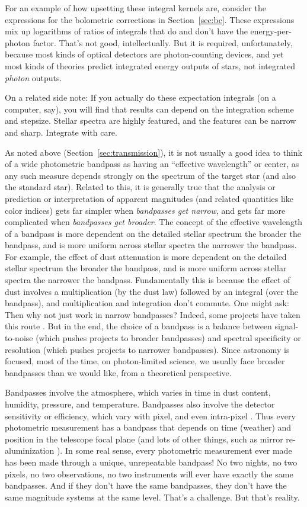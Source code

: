 \documentclass[10pt]{article}
\newcommand{\sectionname}{Section}
\newcommand{\secref}[1]{\sectionname~\ref{#1}}
\begin{document}
For an example of how upsetting these integral kernels are, consider the expressions for the bolometric corrections in \secref{sec:bc}.
These expressions mix up logarithms of ratios of integrals that do and don't have the energy-per-photon factor.
That's not good, intellectually.
But it is required, unfortunately, because most kinds of optical detectors are photon-counting devices, and yet most kinds of theories predict integrated energy outputs of stars, not integrated \emph{photon} outputs.

On a related side note:
If you actually do these expectation integrals (on a computer, say), you will find that results can depend on the integration scheme and stepsize.
Stellar spectra are highly featured, and the features can be narrow and sharp.
Integrate with care.

As noted above (\secref{sec:transmission}), it is not usually a good idea to think of a wide photometric bandpass as having an ``effective wavelength'' or center, as any such measure depends strongly on the spectrum of the target star (and also the standard star).
Related to this, it is generally true that the analysis or prediction or interpretation of apparent magnitudes (and related quantities like color indices) gets far simpler when \emph{bandpasses get narrow}, and gets far more complicated when \emph{bandpasses get broader}.
The concept of the effective wavelength of a bandpass is more dependent on the detailed stellar spectrum the broader the bandpass, and is more uniform across stellar spectra the narrower the bandpass.
For example, the effect of dust attenuation is more dependent on the detailed stellar spectrum the broader the bandpass, and is more uniform across stellar spectra the narrower the bandpass.
Fundamentally this is because the effect of dust involves a multiplication (by the dust law) followed by an integral (over the bandpass), and multiplication and integration don't commute.
One might ask: Then why not just work in narrow bandpasses?
Indeed, some projects have taken this route \cite{combo17}.
But in the end, the choice of a bandpass is a balance between signal-to-noise (which pushes projects to broader bandpasses) and spectral specificity or resolution (which pushes projects to narrower bandpasses).
Since astronomy is focused, most of the time, on photon-limited science, we usually face broader bandpasses than we would like, from a theoretical perspective.

Bandpasses involve the atmosphere, which varies in time in dust content, humidity, pressure, and temperature.
Bandpasses also involve the detector sensitivity or efficiency, which vary with pixel, and even intra-pixel \cite{spitzerpixels}.
Thus every photometric measurement has a bandpass that depends on time (weather) and position in the telescope focal plane (and lots of other things, such as mirror re-aluminization \cite{ubercal}).
In some real sense, every photometric measurement ever made has been made through a unique, unrepeatable bandpass!
No two nights, no two pixels, no two observations, no two instruments will ever have exactly the same bandpasses.
And if they don't have the same bandpasses, they don't have the same magnitude systems at the same level.
That's a challenge. But that's reality.
\end{document}
